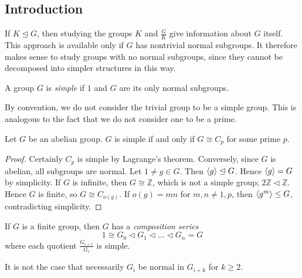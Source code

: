 \subsection{Introduction}
If \( K \trianglelefteq G \), then studying the groups \( K \) and \( \frac{G}{K} \) give information about \( G \) itself.
This approach is available only if \( G \) has nontrivial normal subgroups.
It therefore makes sense to study groups with no normal subgroups, since they cannot be decomposed into simpler structures in this way.
\begin{definition}
	A group \( G \) is \textit{simple} if \( \qty{1} \) and \( G \) are its only normal subgroups.
\end{definition}
By convention, we do not consider the trivial group to be a simple group.
This is analogous to the fact that we do not consider one to be a prime.
\begin{lemma}
	Let \( G \) be an abelian group.
	\( G \) is simple if and only if \( G \cong C_p \) for some prime \( p \).
\end{lemma}
\begin{proof}
	Certainly \( C_p \) is simple by Lagrange's theorem.
	Conversely, since \( G \) is abelian, all subgroups are normal.
	Let \( 1 \neq g \in G \).
	Then \( \langle{} g \rangle \trianglelefteq G \).
	Hence \( \langle{} g \rangle = G \) by simplicity.
	If \( G \) is infinite, then \( G \cong \mathbb Z \), which is not a simple group; \( 2\mathbb Z \triangleleft \mathbb Z \).
	Hence \( G \) is finite, so \( G \cong C_{o(g)} \).
	If \( o(g) = mn \) for \( m, n \neq 1, p \), then \( \langle{} g^m \rangle \leq G \), contradicting simplicity.
\end{proof}
\begin{lemma}
	If \( G \) is a finite group, then \( G \) has a \textit{composition series}
	\[ 1 \cong G_0 \triangleleft G_1 \triangleleft \dots \triangleleft G_n = G \]
	where each quotient \( \frac{G_{i+1}}{G_i} \) is simple.
\end{lemma}
\begin{remark}
	It is not the case that necessarily \( G_i \) be normal in \( G_{i+k} \) for \( k \geq 2 \).
\end{remark}
